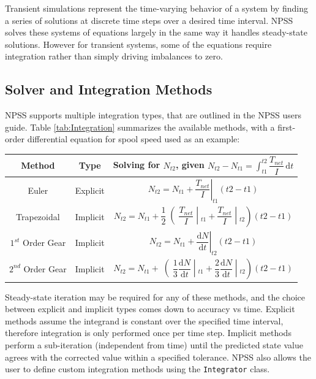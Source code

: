 \documentclass[heading.tex]{subfiles}
\begin{document}
Transient simulations represent the time-varying behavior of a system by finding a series of solutions at discrete time steps over a desired time interval. NPSS solves these systems of equations largely in the same way it handles steady-state solutions. However for transient systems, some of the equations require integration rather than simply driving imbalances to zero. 

\subsection{Solver and Integration Methods}
NPSS supports multiple integration types, that are outlined in the NPSS users guide. \cite[chap.~7.1]{NPSS} Table \ref{tab:Integration} summarizes the available methods, with a first-order differential equation for spool speed used as an example: 

\begin{minipage}{\linewidth}
\centering
\bigskip
{} \label{tab:Integration}
\begin{tabular}{|c|c|c|}
\hline 
Method & Type & Solving for  $N_{t2}$, given  $N_{t2}- N_{t1}= \int_{t1}^{t2} \! \dfrac{T_{net}}{I} \, \mathrm{d}t $\\ 
\hline 
Euler & Explicit & $ \left.N_{t2}= N_{t1} + \dfrac{T_{net}}{I} \right|_{t1}^{}(t2-t1)$ \\ 
\hline 
Trapezoidal & Implicit & $ \left.N_{t2}= N_{t1} + \dfrac{1}{2}\middle(\dfrac{T_{net}}{I} \middle|_{t1}^{}+\dfrac{T_{net}}{I} \middle|_{t2}^{}\right)(t2-t1)$ \\ 
\hline 
$1^{st}$ Order Gear & Implicit & $ \left.N_{t2}= N_{t1} + \dfrac{ \mathrm{d}N }{ \mathrm{d}t } \right|_{t2}^{}(t2-t1)$ \\ 
\hline 
$2^{nd}$ Order Gear & Implicit & $ \left.N_{t2}= N_{t1} + \middle(\dfrac{1}{3}\dfrac{ \mathrm{d}N }{ \mathrm{d}t }\middle|_{t1}^{}+\dfrac{2}{3}\dfrac{ \mathrm{d}N }{ \mathrm{d}t }\middle|_{t2}^{}\right)(t2-t1)$ \\ 
\hline 
\end{tabular} 
\end{minipage}

Steady-state iteration may be required for any of these methods, and the choice between explicit and implicit types comes down to accuracy vs time. Explicit methods assume the integrand is constant over the specified time interval, therefore integration is only performed once per time step. Implicit methods perform a sub-iteration (independent from time) until the predicted state value agrees with the corrected value within a specified tolerance. NPSS also allows the user to define custom integration methods using the \texttt{Integrator} class. \cite[chap.~15.2]{NPSS}  
\end{document}
